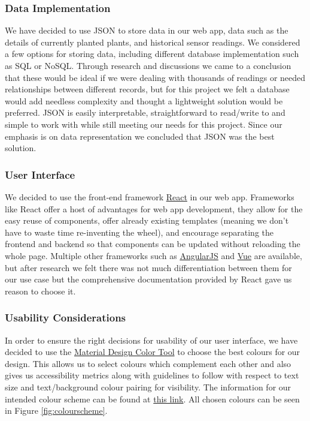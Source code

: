 \documentclass{article}
\begin{document}
\subsubsection{Data Implementation}
We have decided to use JSON to store data in our web app, data such as the details of currently planted plants, and historical sensor readings. We considered a few options for storing data, including different database implementation such as SQL or NoSQL. Through research and discussions we came to a conclusion that these would be ideal if we were dealing with thousands of readings or needed relationships between different records, but for this project we felt a database would add needless complexity and thought a lightweight solution would be preferred. JSON is easily interpretable, straightforward to read/write to and simple to work with while still meeting our needs for this project. Since our emphasis is on data representation we concluded that JSON was the best solution.

\subsubsection{User Interface}

We decided to use the front-end framework \href{https://reactjs.org/}{React} in our web app. Frameworks like React offer a host of advantages for web app development, they allow for the easy reuse of components, offer already existing templates (meaning we don’t have to waste time re-inventing the wheel), and encourage separating the frontend and backend so that components can be updated without reloading the whole page. Multiple other frameworks such as \href{https://angularjs.org/}{AngularJS} and \href{https://vuejs.org/}{Vue} are available, but after research we felt there was not much differentiation between them for our use case but the comprehensive documentation provided by React gave us reason to choose it.

\subsubsection{Usability Considerations}
In order to ensure the right decisions for usability of our user interface, we have decided to use the \href{https://material.io/resources/color/#!/?view.left=0&view.right=0}{Material Design Color Tool} to choose the best colours for our design. This allows us to select colours which complement each other and also gives us accessibility metrics along with guidelines to follow with respect to text size and text/background colour pairing for visibility. The information for our intended colour scheme can be found at \href{https://material.io/resources/color/#!/?view.left=1&view.right=0&primary.color=E8F5E9&secondary.color=F5F5F5&secondary.text.color=212121&primary.text.color=2E7D32}{this link}. All chosen colours can be seen in Figure \ref{fig:colourscheme}.
\end{document}
